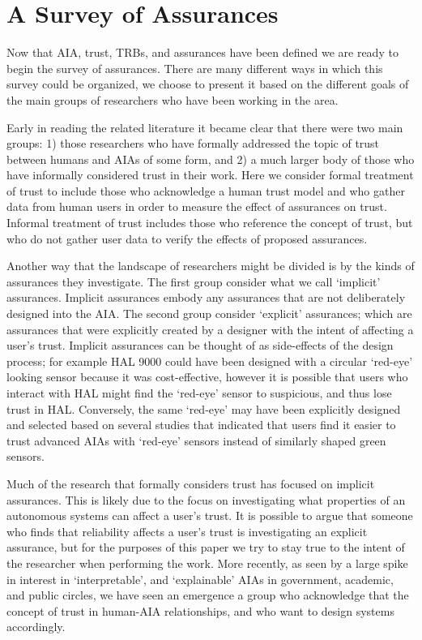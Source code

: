 

\section{A Survey of Assurances} \label{sec:survey}
Now that AIA, trust, TRBs, and assurances have been defined we are ready to begin the survey of assurances. There are many different ways in which this survey could be organized, we choose to present it based on the different goals of the main groups of researchers who have been working in the area.

Early in reading the related literature it became clear that there were two main groups: 1) those researchers who have formally addressed the topic of trust between humans and AIAs of some form, and 2) a much larger body of those who have informally considered trust in their work. Here we consider formal treatment of trust to include those who acknowledge a human trust model and who gather data from human users in order to measure the effect of assurances on trust. Informal treatment of trust includes those who reference the concept of trust, but who do not gather user data to verify the effects of proposed assurances. 

Another way that the landscape of researchers might be divided is by the kinds of assurances they investigate. The first group consider what we call `implicit' assurances. Implicit assurances embody any assurances that are not deliberately designed into the AIA. The second group consider `explicit' assurances; which are assurances that were explicitly created by a designer with the intent of affecting a user's trust. Implicit assurances can be thought of as side-effects of the design process; for example HAL 9000 could have been designed with a circular `red-eye' looking sensor because it was cost-effective, however it is possible that users who interact with HAL might find the `red-eye' sensor to suspicious, and thus lose trust in HAL. Conversely, the same `red-eye' may have been explicitly designed and selected based on several studies that indicated that users find it easier to trust advanced AIAs with `red-eye' sensors instead of similarly shaped green sensors.

Much of the research that formally considers trust has focused on implicit assurances. This is likely due to the focus on investigating what properties of an autonomous systems can affect a user's trust. It is possible to argue that someone who finds that reliability affects a user's trust is investigating an explicit assurance, but for the purposes of this paper we try to stay true to the intent of the researcher when performing the work. More recently, as seen by a large spike in interest in `interpretable', and `explainable' AIAs in government, academic, and public circles, we have seen an emergence a group who acknowledge that the concept of trust in human-AIA relationships, and who want to design systems accordingly.


